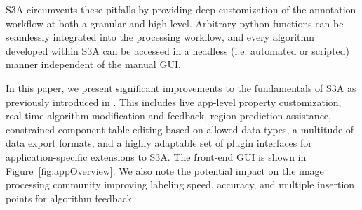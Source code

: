 \makeSampleSegFig
\makeBeesFig


S3A circumvents these pitfalls by providing deep customization of the annotation workflow at both a granular and high level.
Arbitrary python functions can be seamlessly integrated into the processing workflow, and every algorithm developed within S3A can be accessed in a headless (i.e. automated or scripted) manner independent of the manual GUI.

In this paper, we present significant improvements to the fundamentals of S3A as previously introduced in \cite{jessurunComponentDetectionEvaluation2020}.
This includes live app-level property customization, real-time algorithm modification and feedback, region prediction assistance, constrained component table editing based on allowed data types, a multitude of data export formats, and a highly adaptable set of plugin interfaces for application-specific extensions to S3A. The front-end GUI  is shown in Figure~\ref{fig:appOverview}.
We also note the potential impact on the image processing community improving labeling speed, accuracy, and multiple insertion points for algorithm feedback.

\makeAppOverviewFig